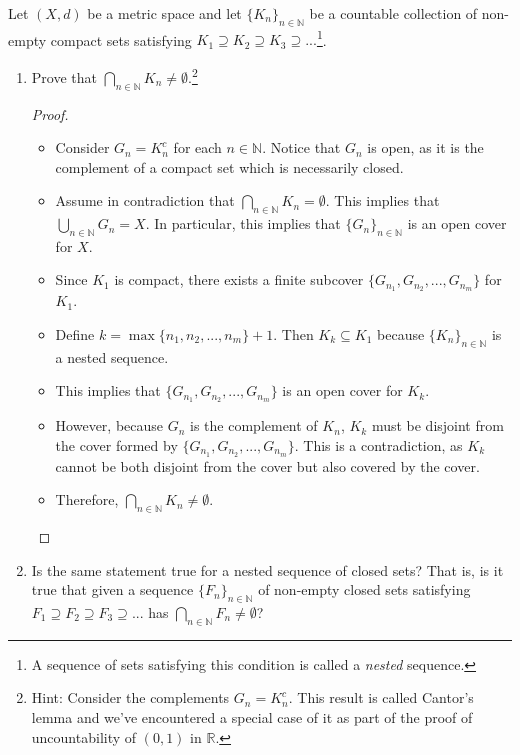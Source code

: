 \documentclass[10pt]{article}
\newcommand{\N}{\mathbb{N}}
\newcommand{\R}{\mathbb{R}}
\newenvironment{problem}[2][Problem]{\begin{trivlist}
\item[\hskip \labelsep {\bfseries #1}\hskip \labelsep {\bfseries #2.}]}{\end{trivlist}}
\begin{document}
\begin{problem}{5}
	Let $ (X,d) $ be a metric space and let $ \{K_n\}_{n \in \N} $ be a countable collection of non-empty compact sets satisfying $ K_1 \supseteq K_2 \supseteq K_3 \supseteq ... $\footnote{A sequence of sets satisfying this condition is called a \emph{nested} sequence.}. 
	\begin{enumerate}
		\item Prove that $ \bigcap_{n \in \N} K_n \neq \emptyset $.\footnote{Hint: Consider the complements $ G_n=K_n^c $. This result is called Cantor's lemma and we've encountered a special case of it as part of the proof of uncountability of $ (0,1) $ in $ \R $.}
            \begin{proof}
                \hfill
                \begin{itemize}
                    \item Consider $G_n = K_n^c$ for each $n \in \N$. Notice that $G_n$ is open, as it is the complement of a compact set which is necessarily closed.
                    \item Assume in contradiction that $\bigcap_{n \in \N} K_n = \emptyset$. This implies that $\bigcup_{n \in \N} G_n = X$.
                        In particular, this implies that $\{G_n\}_{n \in \N}$ is an open cover for $X$.
                    \item Since $K_1$ is compact, there exists a finite subcover $\{G_{n_1}, G_{n_2}, ..., G_{n_m}\}$ for $K_1$.
                    \item Define $k = \max\{n_1, n_2, ..., n_m\} + 1$. Then $K_k \subseteq K_1$ because $\{K_n\}_{n \in \N}$ is a nested sequence.
                    \item This implies that $\{G_{n_1}, G_{n_2}, ..., G_{n_m}\}$ is an open cover for $K_k$.
                    \item However, because $G_n$ is the complement of $K_n$, $K_k$ must be disjoint from the cover formed by $\{G_{n_1}, G_{n_2}, ..., G_{n_m}\}$. This is a contradiction, as $K_k$ cannot be both disjoint from the cover but also covered by the cover.
                    \item Therefore, $\bigcap_{n \in \N} K_n \neq \emptyset$.
                \end{itemize}
            \end{proof}
		\item Is the same statement true for a nested sequence of closed sets? That is, is it true that given a sequence $ \{F_n\}_{n \in \N} $ of non-empty closed sets satisfying $ F_1 \supseteq F_2 \supseteq F_3 \supseteq ... $ has $ \bigcap_{n \in \N} F_n \neq \emptyset $?

\end{enumerate}
\end{problem}
\end{document}
